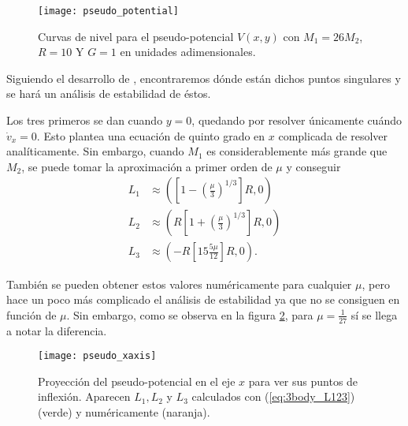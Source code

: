 \begin{figure}[h!]
 \centering
 \texttt{[image: pseudo\_potential]}
 \caption{Curvas de nivel para el pseudo-potencial $V(x,y)$ con $M_1 = 26M_2$, $R = 10$ Y $G=1$ en unidades adimensionales.}
 \label{fig:3body_pseudo_potential}
\end{figure}

Siguiendo el desarrollo de \cite{Cornish1998, Widnall2008}, encontraremos dónde están dichos puntos singulares y se hará un análisis de estabilidad de éstos.

Los tres primeros se dan cuando $y=0$, quedando por resolver únicamente cuándo $\dot{v}_x = 0$. Esto plantea una ecuación de quinto grado en $x$ complicada de resolver analíticamente. Sin embargo, cuando $M_1$ es considerablemente más grande que $M_2$, se puede tomar la aproximación a primer orden de $\mu$ y conseguir
\begin{align}
 L_1 &\approx \left( \left[ 1 - \left(\frac{\mu}{3}\right)^{1/3} \right] R , 0 \right) \nonumber \\ 
 L_2 &\approx \left( R\left[ 1 + \left(\frac{\mu}{3}\right)^{1/3} \right] R , 0 \right) \nonumber \\
 L_3 &\approx \left( -R\left[ 1 5 \frac{5 \mu}{12} \right] R, 0 \right).
 \label{eq:3body_L123}
\end{align} 

También se pueden obtener estos valores numéricamente para cualquier $\mu$, pero hace un poco más complicado el análisis de estabilidad ya que no se consiguen en función de $\mu$. Sin embargo, como se observa en la figura \ref{fig:3body_pseudo_xaxis}, para $\mu = \frac{1}{27}$ sí se llega a notar la diferencia.

\begin{figure}[h!]
 \centering
 \texttt{[image: pseudo\_xaxis]}
 \caption{Proyección del pseudo-potencial en el eje $x$ para ver sus puntos de inflexión. Aparecen $L_1, L_2$ y $L_3$ calculados con (\ref{eq:3body_L123}) (verde) y numéricamente (naranja).}
 \label{fig:3body_pseudo_xaxis}
\end{figure}

